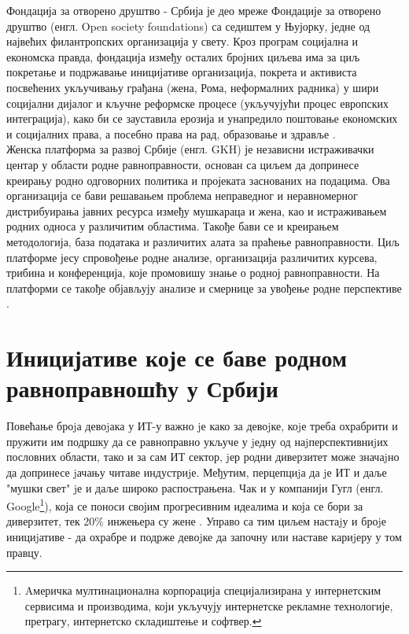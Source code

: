 \documentclass[a4paper]{article}
\begin{document}
Фондација за отворено друштво - Србија је део мреже Фондације за отворено друштво (енгл. Open society foundations) са седиштем у Њујорку, једне од највећих филантропских организација у свету. Кроз програм социјална и економска правда, фондација између осталих бројних циљева има за циљ покретање и подржавање иницијативе организација, покрета и активиста посвећених укључивању грађана (жена, Рома, неформалних радника) у шири социјални дијалог и кључне реформске процесе (укључујући процес европских интеграција), како би се зауставила ерозија и унапредило поштовање економских и социјалних права, а посебно права на рад, образовање и здравље \cite{fondacijaVrata}. \\
    
Женска платформа за развој Србије (енгл. GKH) је независни истраживачки центар у области родне равноправности, основан са циљем да допринесе креирању родно одговорних политика и пројеката заснованих на подацима. Ова организација се бави решавањем проблема неправедног и неравномерног дистрибуирања јавних ресурса између мушкараца и жена, као и истраживањем родних односа у различитим областима. Такође бави се и креирањем методологија, база података и различитих алата за праћење равноправности. Циљ платформе јесу спровођење родне анализе, организација различитих курсева, трибина и конференција, које промовишу знање о родној равноправности. На платформи се такође објављују анализе и смернице за увођење родне перспективе \cite{fondacijaZene}. 

\section{Иницијативе које се баве родном равноправношћу у Србији}
\label{sec:naslov3}

Повећање броjа девоjака у ИТ-у важно jе како за девоjке, коjе
треба охрабрити и пружити им подршку да се равноправно укључе у
jедну од наjперспективниjих пословних области, тако и за сам ИТ сектор, 
jер родни диверзитет може значаjно да допринесе jачању читаве индустриjе. 
Међутим, перцепциjа да jе ИТ и даље "мушки свет" jе и
даље широко распострањена. Чак и у компанији Гугл (енгл. Google\footnote{Aмеричка мултинационална 
корпорација специјализирана у интернетским сервисима и производима, који укључују интернетске 
рекламне технологије, претрагу, интернетско складиштење и софтвер.}), која се поноси својим 
прогресивним идеалима и која се бори за диверзитет, тек 20\% инжењера су жене \cite{gugl}. 
Управо са тим циљем настаjу и броjе инициjативе - да охрабре и подрже девоjке 
да започну или наставе кариjеру у том правцу.\\
\end{document}
